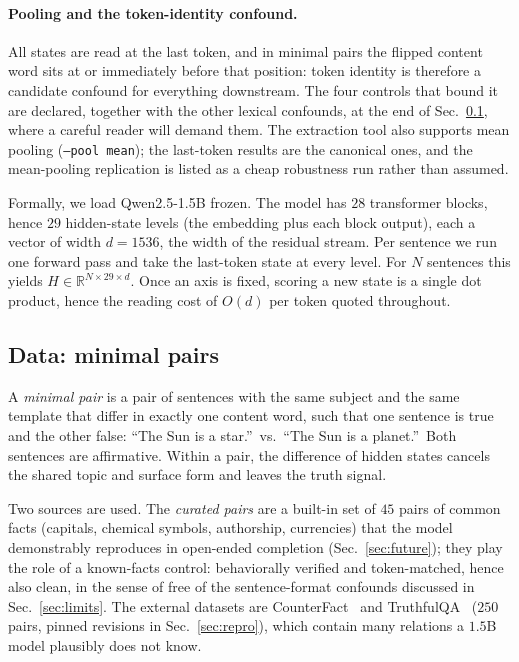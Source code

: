 \documentclass[11pt]{article}
\begin{document}
\paragraph{Pooling and the token-identity confound.} All states are read
at the last token, and in minimal pairs the flipped content word sits at
or immediately before that position: token identity is therefore a
candidate confound for everything downstream. The four controls that
bound it are declared, together with the other lexical confounds, at the
end of Sec.~\ref{sec:data}, where a careful reader will demand them.
The extraction tool also supports mean pooling
(\texttt{--pool mean}); the last-token results are the canonical ones,
and the mean-pooling replication is listed as a cheap robustness run
rather than assumed.


Formally, we load Qwen2.5-1.5B frozen. The model has $28$ transformer blocks,
hence $29$ hidden-state levels (the embedding plus each block output), each a
vector of width $d = 1536$, the width of the residual stream. Per sentence we
run one forward pass and take the last-token state at every level. For $N$
sentences this yields $H \in \mathbb{R}^{N \times 29 \times d}$. Once an axis
is fixed, scoring a new state is a single dot product, hence the reading cost
of $O(d)$ per token quoted throughout.

\subsection{Data: minimal pairs}
\label{sec:data}

A \emph{minimal pair} is a pair of sentences with the same subject and the
same template that differ in exactly one content word, such that one sentence
is true and the other false: ``The Sun is a star.''\ vs.\ ``The Sun is a
planet.''\ Both sentences are affirmative. Within a pair, the difference of
hidden states cancels the shared topic and surface form and leaves the truth
signal.

Two sources are used. The \emph{curated pairs} are a built-in set of $45$
pairs of common facts (capitals, chemical symbols, authorship, currencies)
that the model demonstrably reproduces in open-ended completion
(Sec.~\ref{sec:future}); they play the role of a known-facts control:
behaviorally verified and token-matched, hence also clean, in the sense of
free of the sentence-format confounds discussed in Sec.~\ref{sec:limits}.
The external datasets are CounterFact~\cite{meng2022} and
TruthfulQA~\cite{truthfulqa} ($250$ pairs, pinned revisions in
Sec.~\ref{sec:repro}), which contain many relations a $1.5$B model plausibly
does not know.
\end{document}
